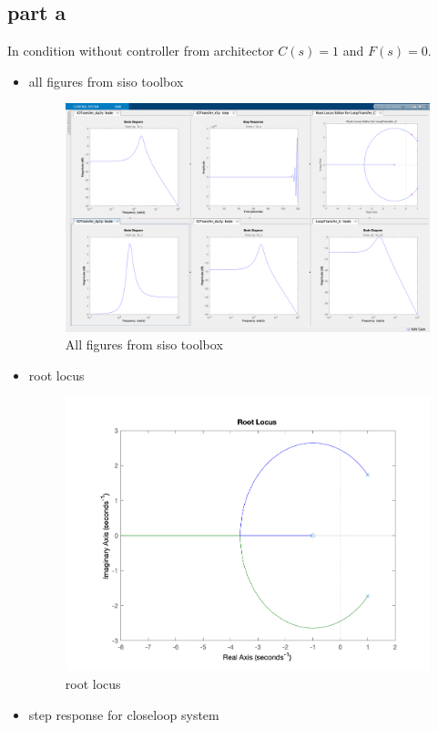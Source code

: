 \subsection{part a}
In condition without controller from architector $C(s) = 1$ and $F(s) = 0$.
\begin{itemize}
	\item all figures from siso toolbox
	\begin{figure}[H]
		\caption{All figures from siso toolbox}
		\centering
		\includegraphics[width=16cm]{../Figure/Q1/Q1_a/siso_all.png}
	\end{figure}
	\newpage
	\item root locus
	\begin{figure}[H]
		\caption{root locus}
		\centering
		\includegraphics[width=12cm]{../Figure/Q1/Q1_a/rlocus.png}
	\end{figure}
	\item step response for closeloop system

\end{itemize}
